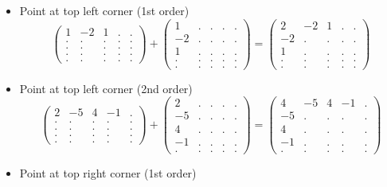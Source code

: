 \begin{itemize}
\item Point at top left corner (1st order)
\[
\begin{pmatrix}
1 & -2 &  1 & . & . \\
. & . &  . & . & . \\
. & . &  . & . & . \\
. & . &  . & . & . \\
. & . &  . & . & . 
\end{pmatrix}
+
\begin{pmatrix}
1 & . &  . & . & . \\
-2 & . &  . & . & . \\
1 & . &  . & . & . \\
. & . &  . & . & . \\
. & . &  . & . & . 
\end{pmatrix}
=
\begin{pmatrix}
2 & -2 &  1 & . & . \\
-2 & . &  . & . & . \\
1 & . &  . & . & . \\
. & . &  . & . & . \\
. & . &  . & . & . 
\end{pmatrix}
\]


\item Point at top left corner (2nd order)
\[
\begin{pmatrix}
2 & -5 &  4 & -1 & . \\
. & . &  . & . & . \\
. & . &  . & . & . \\
. & . &  . & . & . \\
. & . &  . & . & . 
\end{pmatrix}
+
\begin{pmatrix}
2 & . &  . & . & . \\
-5 & . &  . & . & . \\
4 & . &  . & . & . \\
-1 & . &  . & . & . \\
. & . &  . & . & . 
\end{pmatrix}
=
\begin{pmatrix}
4 & -5 &  4 & -1 & . \\
-5 & . &  . & . & . \\
4 & . &  . & . & . \\
-1 & . &  . & . & . \\
. & . &  . & . & . 
\end{pmatrix}
\]




\item Point at top right corner (1st order)


\end{itemize}
